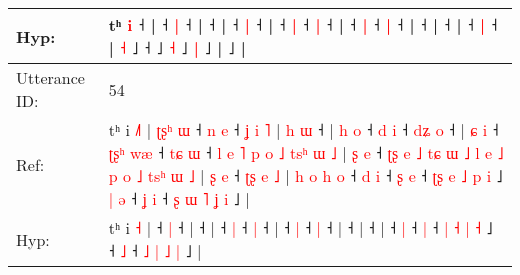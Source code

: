 \documentclass[10pt]{article}
\DeclareRobustCommand{\hl}[1]{{\textcolor{red}{#1}}}
\begin{document}
\begin{longtable}{ll}
 \\
Hyp: & \hl{}\hl{}\hl{}\hl{}\hl{}\hl{}\hl{}\hl{}\hl{}\hl{}\hl{}\hl{}\hl{}\hl{}\hl{}\hl{}\hl{}\hl{}\hl{}\hl{}\hl{}\hl{}\hl{}\hl{}\hl{}\hl{}\hl{}\hl{}t\hl{}ʰ \hl{i} ˧\hl{}\hl{}\hl{}\hl{}\hl{}\hl{}\hl{}\hl{}\hl{}\hl{} |\hl{}\hl{} ˧\hl{}\hl{} \hl{|} ˧ |\hl{}\hl{}\hl{} ˧\hl{} |\hl{}\hl{} ˧\hl{}\hl{} \hl{|} ˧ |\hl{}\hl{}\hl{}\hl{} ˧\hl{}\hl{} \hl{|} ˧\hl{}\hl{} \hl{|} ˧ |\hl{}\hl{} ˧\hl{}\hl{} \hl{|} ˧\hl{}\hl{} \hl{|} ˧\hl{}\hl{}\hl{}\hl{}\hl{}\hl{}\hl{} |\hl{}\hl{}\hl{}\hl{} ˧\hl{}\hl{}\hl{}\hl{}\hl{}\hl{}\hl{}\hl{}\hl{}\hl{}\hl{}\hl{} |\hl{}\hl{}\hl{}\hl{} ˧ |\hl{}\hl{}\hl{}\hl{}\hl{}\hl{} ˧\hl{}\hl{} \hl{|} ˧\hl{}\hl{}\hl{}\hl{}\hl{}\hl{} |\hl{}\hl{}\hl{}\hl{}\hl{}\hl{}\hl{}\hl{}\hl{}\hl{}\hl{}\hl{}\hl{}\hl{}\hl{} \hl{˧} ˩\hl{}\hl{}\hl{}\hl{}\hl{}\hl{}\hl{} ˧\hl{}\hl{}\hl{}\hl{}\hl{} ˩\hl{}\hl{} \hl{˧} ˩\hl{}\hl{} \hl{|} ˩ |\hl{}\hl{}\hl{}\hl{}\hl{}\hl{}\hl{}\hl{}\hl{}\hl{}\hl{}\hl{}\hl{}\hl{}\hl{}\hl{}\hl{}\hl{}\hl{}\hl{} ˩ |
 \\
\midrule
Utterance ID: & 54 \\
Ref: & tʰ i \hl{˩}\hl{˥} |\hl{ }\hl{ʈ}\hl{ʂ}\hl{ʰ}\hl{ }\hl{ɯ} ˧\hl{ }\hl{n} \hl{e} ˧\hl{ }\hl{ʝ}\hl{ }\hl{i}\hl{ }\hl{˥} |\hl{ }\hl{h}\hl{ }\hl{ɯ} ˧ |\hl{ }\hl{h}\hl{ }\hl{o} ˧\hl{ }\hl{d} \hl{i} ˧\hl{ }\hl{d}\hl{ʑ} \hl{o} ˧ |\hl{ }\hl{ɕ}\hl{ }\hl{i} ˧\hl{ }\hl{ʈ}\hl{ʂ}\hl{ʰ} \hl{w}\hl{æ} ˧\hl{ }\hl{t}\hl{ɕ} \hl{ɯ} ˧\hl{ }\hl{l}\hl{ }\hl{e}\hl{ }\hl{˥}\hl{ }\hl{p}\hl{ }\hl{o}\hl{ }\hl{˩}\hl{ }\hl{t}\hl{s}\hl{ʰ}\hl{ }\hl{ɯ}\hl{ }\hl{˩} |\hl{ }\hl{ʂ}\hl{ }\hl{e} ˧\hl{ }\hl{ʈ}\hl{ʂ}\hl{ }\hl{e}\hl{ }\hl{˩}\hl{ }\hl{t}\hl{ɕ}\hl{ }\hl{ɯ}\hl{ }\hl{˩}\hl{ }\hl{l}\hl{ }\hl{e}\hl{ }\hl{˩}\hl{ }\hl{p}\hl{ }\hl{o}\hl{ }\hl{˩}\hl{ }\hl{t}\hl{s}\hl{ʰ}\hl{ }\hl{ɯ}\hl{ }\hl{˩} |\hl{ }\hl{ʂ}\hl{ }\hl{e} ˧\hl{ }\hl{ʈ}\hl{ʂ}\hl{ }\hl{e}\hl{ }\hl{˩} |\hl{ }\hl{h}\hl{ }\hl{o}\hl{ }\hl{h}\hl{ }\hl{o} ˧\hl{ }\hl{d} \hl{i} ˧\hl{ }\hl{ʂ} \hl{e} ˧\hl{ }\hl{ʈ}\hl{ʂ} \hl{e} \hl{˩} \hl{p} \hl{i} ˩\hl{ }\hl{|}\hl{ }\hl{ə} ˧\hl{ }\hl{ʝ} \hl{i} ˧\hl{ }\hl{ʂ} \hl{ɯ} \hl{˥} \hl{ʝ} \hl{i} ˩ |
 \\
Hyp: & tʰ i \hl{}\hl{˧} |\hl{}\hl{}\hl{}\hl{}\hl{}\hl{} ˧\hl{}\hl{} \hl{|} ˧\hl{}\hl{}\hl{}\hl{}\hl{}\hl{} |\hl{}\hl{}\hl{}\hl{} ˧ |\hl{}\hl{}\hl{}\hl{} ˧\hl{}\hl{} \hl{|} ˧\hl{}\hl{}\hl{} \hl{|} ˧ |\hl{}\hl{}\hl{}\hl{} ˧\hl{}\hl{}\hl{}\hl{} \hl{}\hl{|} ˧\hl{}\hl{}\hl{} \hl{|} ˧\hl{}\hl{}\hl{}\hl{}\hl{}\hl{}\hl{}\hl{}\hl{}\hl{}\hl{}\hl{}\hl{}\hl{}\hl{}\hl{}\hl{}\hl{}\hl{}\hl{} |\hl{}\hl{}\hl{}\hl{} ˧\hl{}\hl{}\hl{}\hl{}\hl{}\hl{}\hl{}\hl{}\hl{}\hl{}\hl{}\hl{}\hl{}\hl{}\hl{}\hl{}\hl{}\hl{}\hl{}\hl{}\hl{}\hl{}\hl{}\hl{}\hl{}\hl{}\hl{}\hl{}\hl{}\hl{}\hl{}\hl{}\hl{}\hl{} |\hl{}\hl{}\hl{}\hl{} ˧\hl{}\hl{}\hl{}\hl{}\hl{}\hl{}\hl{} |\hl{}\hl{}\hl{}\hl{}\hl{}\hl{}\hl{}\hl{} ˧\hl{}\hl{} \hl{|} ˧\hl{}\hl{} \hl{|} ˧\hl{}\hl{}\hl{} \hl{|} \hl{˧} \hl{|} \hl{˧} ˩\hl{}\hl{}\hl{}\hl{} ˧\hl{}\hl{} \hl{˩} ˧\hl{}\hl{} \hl{˩} \hl{|} \hl{˩} \hl{|} ˩ |

\end{longtable}
\end{document}
